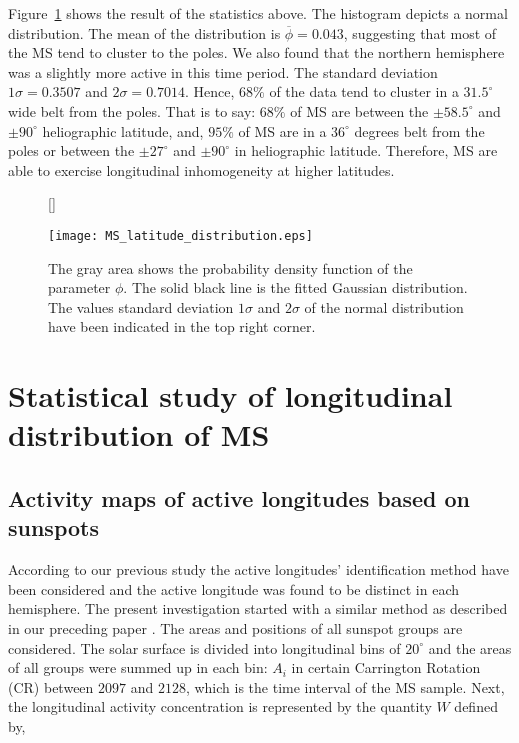 Figure~\ref{ms_dis} shows the result of the statistics above. The histogram depicts a normal distribution. The mean of the distribution is $\overline{\phi}=0.043$, suggesting that most of the MS tend to cluster to the poles. We also found that the northern hemisphere was a slightly more active in this time period. The standard deviation $1\sigma=0.3507$ and $2\sigma=0.7014$. Hence, $68\%$ of the data tend to cluster in a $31.5^{\circ}$ wide belt from the poles. That is to say: $68\%$ of MS are between the $\pm58.5^{\circ}$ and $\pm90^{\circ}$ heliographic latitude, and, $95\%$ of MS are in a $36^{\circ}$ degrees belt from the poles or between the $\pm27^{\circ}$ and $\pm90^{\circ}$ in heliographic latitude. Therefore, MS are able to exercise longitudinal inhomogeneity at higher latitudes.

\begin{figure}
	[\FBwidth]
	{\caption{ The gray area shows the probability density function of the parameter $\phi$. The solid black line is the fitted Gaussian distribution. The values standard deviation $1\sigma$ and $2\sigma$ of the normal distribution have been indicated in the top right corner.}\label{ms_dis}}
	{\texttt{[image: MS\_latitude\_distribution.eps]}}
\end{figure}

\section{Statistical study of longitudinal distribution of MS}
\subsection{Activity maps of active longitudes based on sunspots}

According to our previous study \citep{Gyenge2014} the active longitudes' identification method have been considered and the active longitude was found to be distinct in each hemisphere. The present investigation started with a similar method as described in our preceding paper \citep{Gyenge2012}. The areas and positions of all sunspot groups are considered. The solar surface is divided into longitudinal bins of $20^{\circ}$ and the areas of all groups were summed up in each bin: $ A_{i}$ in certain Carrington Rotation (CR) between $2097$ and $2128$, which is the time interval of the MS sample. Next, the longitudinal activity concentration is represented by the quantity $W$ defined by,

